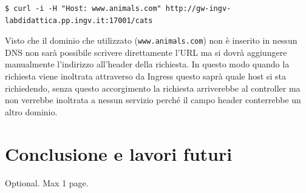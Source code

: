 \documentclass[12pt,a4paper,openright,twoside]{book}
\begin{document}
\begin{lstlisting}
$ curl -i -H "Host: www.animals.com" http://gw-ingv-labdidattica.pp.ingv.it:17001/cats
\end{lstlisting}
Visto che il dominio che utilizzato (\texttt{www.animals.com}) non è inserito in nessun DNS non sarà possibile scrivere direttamente l'URL ma si dovrà aggiungere manualmente
l'indirizzo all'header della richiesta. In questo modo quando la richiesta viene inoltrata attraverso da Ingress questo saprà quale host si sta richiedendo,
senza questo accorgimento la richiesta arriverebbe al controller ma non verrebbe inoltrata a nessun servizio perché il campo header conterrebbe un altro dominio. 

\chapter{Conclusione e lavori futuri}
%
%


\backmatter

\nocite{*} %




\begin{acknowledgements} %
Optional. Max 1 page.
\end{acknowledgements}
\end{document}
